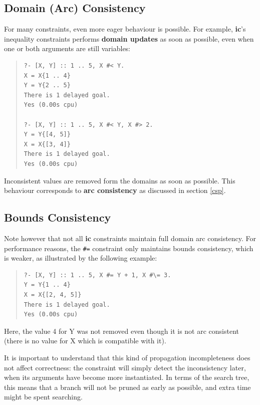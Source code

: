 \subsection{Domain (Arc) Consistency}
For many constraints, even more eager behaviour is possible.
For example, {\bf ic}'s inequality constraints performs {\bf domain updates} as
soon as possible, even when one or both arguments are still variables:
\begin{quote}\begin{verbatim}
?- [X, Y] :: 1 .. 5, X #< Y.
X = X{1 .. 4}
Y = Y{2 .. 5}
There is 1 delayed goal.
Yes (0.00s cpu)

?- [X, Y] :: 1 .. 5, X #< Y, X #> 2.
Y = Y{[4, 5]}
X = X{[3, 4]}
There is 1 delayed goal.
Yes (0.00s cpu)
\end{verbatim}\end{quote}
Inconsistent values are removed form the domains as soon as possible.
This behaviour corresponds to {\bf arc consistency} as discussed in
section \ref{csp}.

\subsection{Bounds Consistency}
Note however that not all {\bf ic} constraints maintain full domain
arc consistency.  For performance reasons, 
the \verb.#=. constraint only maintains bounds consistency, which is
weaker, as illustrated by the following example:
\begin{quote}\begin{verbatim}
?- [X, Y] :: 1 .. 5, X #= Y + 1, X #\= 3.
Y = Y{1 .. 4}
X = X{[2, 4, 5]}
There is 1 delayed goal.
Yes (0.00s cpu)
\end{verbatim}\end{quote}
Here, the value 4 for Y was not removed even though it is not arc consistent
(there is no value for X which is compatible with it).

It is important to understand that this kind of propagation incompleteness
does not affect correctness: the constraint will simply detect the
inconsistency later, when its arguments have become more instantiated.
In terms of the search tree, this means that a branch will not be pruned
as early as possible, and extra time might be spent searching.




